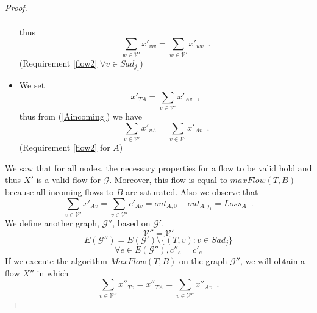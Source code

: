 \documentclass[11pt]{llncs}
\begin{document}
\begin{proof}
\begin{itemize}
\begin{equation}
\begin{gathered}
          \end{gathered}
          \end{equation}
          thus
          \begin{equation}
             \sum\limits_{w \in \mathcal{V}'}x'_{vw} = \sum\limits_{w \in \mathcal{V}'}x'_{wv} \enspace.
          \end{equation}
          (Requirement \ref{flow2} $\forall v \in Sad_{j_1}$)
          \item We set
          \begin{equation}
             x'_{TA} = \sum\limits_{v \in \mathcal{V}'}x'_{Av} \enspace,
          \end{equation}
          thus from (\ref{Aincoming}) we have
          \begin{equation}
             \sum\limits_{v \in \mathcal{V}'}x'_{vA} = \sum\limits_{v \in \mathcal{V}'}x'_{Av} \enspace.
          \end{equation}
          (Requirement \ref{flow2} for $A$)
       \end{itemize}
       We saw that for all nodes, the necessary properties for a flow to be valid hold and thus $X'$ is a valid flow for
       $\mathcal{G}$. Moreover, this flow is equal to $maxFlow(T, B)$ because all incoming flows to $B$ are saturated.
       Also we observe that
       \begin{equation}
       \label{xprimeequalloss}
          \sum\limits_{v \in \mathcal{V}'}x'_{Av} = \sum\limits_{v \in \mathcal{V}'}c'_{Av} = out_{A, 0} - out_{A, j_1} =
          Loss_A \enspace.
       \end{equation}
       We define another graph, $\mathcal{G}''$, based on $\mathcal{G}'$.
       \begin{equation}
          \mathcal{V}'' = \mathcal{V}'
       \end{equation}
       \begin{equation}
          E(\mathcal{G}'') = E(\mathcal{G}') \setminus \{(T, v) : v \in Sad_j\}
       \end{equation}
       \begin{equation}
          \forall e \in E(\mathcal{G}''), c''_e = c'_e
       \end{equation}
       If we execute the algorithm $MaxFlow(T, B)$ on the graph $\mathcal{G}''$, we will obtain a flow $X''$ in which
       \begin{equation}
          \sum\limits_{v \in \mathcal{V}''}x''_{Tv} = x''_{TA} = \sum\limits_{v \in \mathcal{V}''}x''_{Av} \enspace.
       \end{equation}

\end{proof}
\end{document}
